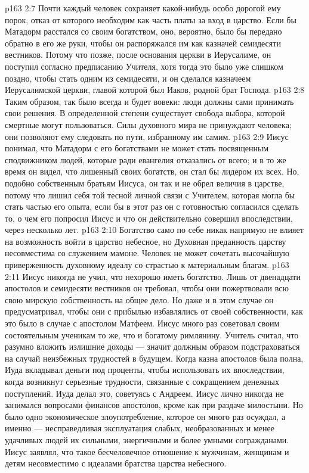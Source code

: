 \vs p163 2:7 \pc Почти каждый человек сохраняет какой\hyp{}нибудь особо дорогой ему порок, отказ от которого необходим как часть платы за вход в царство. Если бы Матадорм расстался со своим богатством, оно, вероятно, было бы передано обратно в его же руки, чтобы он распоряжался им как казначей семидесяти вестников. Потому что позже, после основания церкви в Иерусалиме, он поступил согласно предписанию Учителя, хотя тогда это было уже слишком поздно, чтобы стать одним из семидесяти, и он сделался казначеем Иерусалимской церкви, главой которой был Иаков, родной брат Господа.
\vs p163 2:8 Таким образом, так было всегда и будет вовеки: люди должны сами принимать свои решения. В определенной степени существует свобода выбора, которой смертные могут пользоваться. Силы духовного мира не принуждают человека; они позволяют ему следовать по пути, избранному им самим.
\vs p163 2:9 Иисус понимал, что Матадорм с его богатствами не может стать посвященным сподвижником людей, которые ради евангелия отказались от всего; и в то же время он видел, что лишенный своих богатств, он стал бы лидером их всех. Но, подобно собственным братьям Иисуса, он так и не обрел величия в царстве, потому что лишил себя той тесной личной связи с Учителем, которая могла бы стать частью его опыта, если бы в этот раз он с готовностью согласился сделать то, о чем его попросил Иисус и что он действительно совершил впоследствии, через несколько лет.
\vs p163 2:10 Богатство само по себе никак напрямую не влияет на возможность войти в царство небесное, но  Духовная преданность царству несовместима со служением мамоне. Человек не может сочетать высочайшую приверженность духовному идеалу со страстью к материальным благам.
\vs p163 2:11 Иисус никогда не учил, что нехорошо иметь богатство. Лишь от двенадцати апостолов и семидесяти вестников он требовал, чтобы они пожертвовали всю свою мирскую собственность на общее дело. Но даже и в этом случае он предусматривал, чтобы они с прибылью избавлялись от своей собственности, как это было в случае с апостолом Матфеем. Иисус много раз советовал своим состоятельным ученикам то же, что и богатому римлянину. Учитель считал, что разумно вложить излишние доходы --- значит должным образом подстраховаться на случай неизбежных трудностей в будущем. Когда казна апостолов была полна, Иуда вкладывал деньги под проценты, чтобы использовать их впоследствии, когда возникнут серьезные трудности, связанные с сокращением денежных поступлений. Иуда делал это, советуясь с Андреем. Иисус лично никогда не занимался вопросами финансов апостолов, кроме как при раздаче милостыни. Но было одно экономическое злоупотребление, которое он много раз осуждал, а именно --- несправедливая эксплуатация слабых, необразованных и менее удачливых людей их сильными, энергичными и более умными согражданами. Иисус заявлял, что такое бесчеловечное отношение к мужчинам, женщинам и детям несовместимо с идеалами братства царства небесного.
